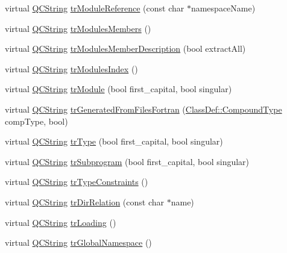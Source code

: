 \begin{DoxyCompactItemize}
\item 
virtual \hyperlink{class_q_c_string}{Q\-C\-String} \hyperlink{class_translator_croatian_a5b0385db8ce8e7c8251e31867c6fa8d5}{tr\-Module\-Reference} (const char $\ast$namespace\-Name)
\item 
virtual \hyperlink{class_q_c_string}{Q\-C\-String} \hyperlink{class_translator_croatian_a75279d9914e0cc54ee5f4b15ddaa234c}{tr\-Modules\-Members} ()
\item 
virtual \hyperlink{class_q_c_string}{Q\-C\-String} \hyperlink{class_translator_croatian_a26dd0f47c7f59841f901da7f4bd19306}{tr\-Modules\-Member\-Description} (bool extract\-All)
\item 
virtual \hyperlink{class_q_c_string}{Q\-C\-String} \hyperlink{class_translator_croatian_a8a71cbe9e0669d3555731c3ebc0aae35}{tr\-Modules\-Index} ()
\item 
virtual \hyperlink{class_q_c_string}{Q\-C\-String} \hyperlink{class_translator_croatian_a894e0b632e1680e918c78fea5b9b5384}{tr\-Module} (bool first\-\_\-capital, bool singular)
\item 
virtual \hyperlink{class_q_c_string}{Q\-C\-String} \hyperlink{class_translator_croatian_ad56ee2b4646b53abea0fd11f17a32fc5}{tr\-Generated\-From\-Files\-Fortran} (\hyperlink{class_class_def_a768a6f0a6fd7e9087ff7971abbcc3f36}{Class\-Def\-::\-Compound\-Type} comp\-Type, bool)
\item 
virtual \hyperlink{class_q_c_string}{Q\-C\-String} \hyperlink{class_translator_croatian_a2763a6af55d1ca03be54604c2bc4a3b4}{tr\-Type} (bool first\-\_\-capital, bool singular)
\item 
virtual \hyperlink{class_q_c_string}{Q\-C\-String} \hyperlink{class_translator_croatian_aeceda8d8c2b8645fd2337cb38d293269}{tr\-Subprogram} (bool first\-\_\-capital, bool singular)
\item 
virtual \hyperlink{class_q_c_string}{Q\-C\-String} \hyperlink{class_translator_croatian_a196f3eb690f2748ee71f518cf02bd7fe}{tr\-Type\-Constraints} ()
\item 
virtual \hyperlink{class_q_c_string}{Q\-C\-String} \hyperlink{class_translator_croatian_a38a56cc8bcc5323be9d1f09b0daa5933}{tr\-Dir\-Relation} (const char $\ast$name)
\item 
virtual \hyperlink{class_q_c_string}{Q\-C\-String} \hyperlink{class_translator_croatian_aca8cf7409bceb9f8e6af47f637da5457}{tr\-Loading} ()
\item 
virtual \hyperlink{class_q_c_string}{Q\-C\-String} \hyperlink{class_translator_croatian_aa9fd39641e570165be20c71c67481fee}{tr\-Global\-Namespace} ()

\end{DoxyCompactItemize}
